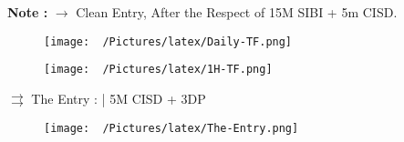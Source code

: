 \documentclass{article}
\begin{document}
\begin{center}
\begin{mdframed}[style=MyQuoteFrame]
  \textbf{Note :} $\rightarrow$ Clean Entry, After the Respect of 15M SIBI + 5m CISD.
\end{mdframed}
\end{center}
\newpage

\centering
\begin{figure}[h]
\begin{adjustbox}{width=1.1\textwidth,center}
  \texttt{[image: ~/Pictures/latex/Daily-TF.png]}
\end{adjustbox}
  \label{fig:image}
\end{figure}

\begin{figure}[h]
\begin{adjustbox}{width=1.1\textwidth,center}
  \texttt{[image: ~/Pictures/latex/1H-TF.png]}
\end{adjustbox}
  \label{fig:image}
\end{figure}


\newpage

\( \rightrightarrows \) The Entry : |  5M CISD + 3DP
\begin{figure}[h]
  \begin{adjustbox}{width=1.1\textwidth,center}
  \texttt{[image: ~/Pictures/latex/The-Entry.png]}
\end{adjustbox}
\label{fig:image}
\end{figure}

\end{document}
